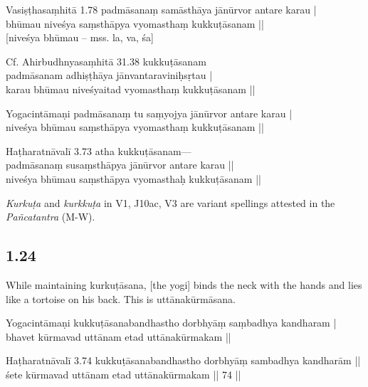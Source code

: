 \begin{ekdosis}
\begin{sources}[hp01_023]
Vasiṣṭhasaṃhitā 1.78
\startverse
padmāsanaṃ samāsthāya jānūrvor antare karau |\\
bhūmau niveśya saṃsthāpya vyomasthaṃ kukkuṭāsanam ||\\
{[}niveśya bhūmau – mss. la, va, śa]
\endverse

Cf. Ahirbudhnyasaṃhitā 31.38
\startverse
kukkuṭāsanam\\
padmāsanam adhiṣṭhāya jānvantaraviniḥsṛtau |\\
karau bhūmau niveśyaitad vyomasthaṃ kukkuṭāsanam || 
\endverse
\end{sources}

\begin{testimonia}[hp01_023]
Yogacintāmaṇi
\startverse
padmāsanaṃ tu saṃyojya jānūrvor antare karau | \\
niveśya bhūmau saṃsthāpya vyomasthaṃ kukkuṭāsanam ||
\endverse

Haṭharatnāvalī 3.73
\startverse
atha kukkuṭāsanam---\\
padmāsanaṃ susaṃsthāpya jānūrvor antare karau ||\\
niveśya bhūmau saṃsthāpya vyomasthaḥ kukkuṭāsanam ||
\endverse
\end{testimonia}

\begin{philcomm}[hp01_023]
\emph{Kurkuṭa} and \emph{kurkkuṭa} in V1, J10ac, V3 are variant spellings attested in the \emph{Pañcatantra} (M-W).
\end{philcomm}

\subsection*{1.24}
\begin{translation}[hp01_024]
While maintaining kurkuṭāsana, [the yogi] binds the neck with the hands and lies like a tortoise on his back. This is uttānakūrmāsana.
\end{translation}

\begin{testimonia}[hp01_024]
Yogacintāmaṇi
\startverse
kukkuṭāsanabandhastho dorbhyāṃ saṃbadhya kandharam |\\
bhavet kūrmavad uttānam etad uttānakūrmakam ||
\endverse

Haṭharatnāvalī 3.74
\startverse
kukkuṭāsanabandhastho dorbhyāṃ sambadhya kandharām ||\\
śete kūrmavad uttānam etad uttānakūrmakam || 74 ||
\endverse
\end{testimonia}


\end{ekdosis}
